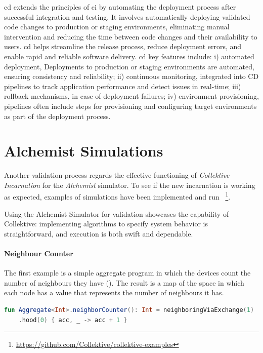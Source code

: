 \ac{cd} extends the principles of \ac{ci} by automating the deployment process after successful integration and testing.
It involves automatically deploying validated code changes to production or staging environments, eliminating manual
intervention and reducing the time between code changes and their availability to users.
\ac{cd} helps streamline the release process, reduce deployment errors, and enable rapid and reliable software delivery.
\ac{cd} key features include:
    i) automated deployment, Deployments to production or staging environments are automated, ensuring consistency and reliability;
    ii) continuous monitoring, integrated into CD pipelines to track application performance and detect issues in real-time;
    iii) rollback mechanisms, in case of deployment failures;
    iv) environment provisioning, pipelines often include steps for provisioning and configuring target environments as part of the deployment process.

\section{Alchemist Simulations}
\label{sec:alchemist-simulations}
Another validation process regards the effective functioning of \emph{Collektive Incarnation} for the \emph{Alchemist} simulator.
To see if the new incarnation is working as expected, examples of simulations have been implemented and run
~\footnote{\url{https://github.com/Collektive/collektive-examples}}.

Using the Alchemist Simulator for validation showcases the capability of Collektive: implementing algorithms to specify
system behavior is straightforward, and execution is both swift and dependable.

\paragraph{Neighbour Counter}
The first example is a simple aggregate program in which the devices count the number of neighbours they have ().
The result is a map of the space in which each node has a value that represents the number of neighbours it has.

\begin{lstlisting}[language=kt, caption={Neighbour counter code example}, label={lst:neighbour-counter-example}]
fun Aggregate<Int>.neighborCounter(): Int = neighboringViaExchange(1)
    .hood(0) { acc, _ -> acc + 1 }
\end{lstlisting}

